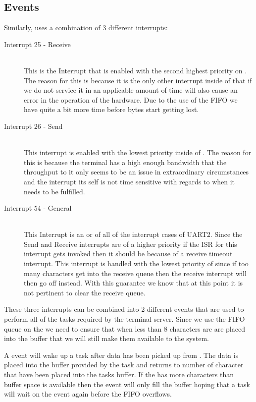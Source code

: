 \documentclass[pdftex,10pt,a4paper]{article}
\begin{document}
\subsection*{ Events}
Similarly,  uses a combination of 3 different interrupts:
\begin{description}
\item[Interrupt 25 -  Receive] \hfill \\
	This is the Interrupt that is enabled with the second highest priority
	on . The reason for this is because it is the only other
	interrupt inside of  that if we do not service it in an
	applicable amount of time will also cause an error in the operation of
	the hardware. Due to the use of the FIFO we have quite a bit more time
	before bytes start getting lost.
\item[Interrupt 26 -  Send] \hfill \\
	This interrupt is enabled with the lowest priority inside of
	. The reason for this is because the terminal has a high
	enough bandwidth that the throughput to it only seems to be an issue
	in extraordinary circumstances and the interrupt its self is not time
	sensitive with regards to when it needs to be fulfilled.
\item[Interrupt 54 -  General] \hfill \\
	This Interrupt is an or of all of the interrupt cases of UART2.
	Since the  Send and Receive interrupts are of a higher
	priority if the ISR for this interrupt gets invoked then it should
	be because of a receive timeout interrupt. This interrupt is handled
	with the lowest priority of  since if too many characters
	get into the receive queue then the  receive interrupt
	will then go off instead. With this guarantee we know that at this
	point it is not pertinent to clear the receive queue.
\end{description}

These three interrupts can be combined into 2 different events that are used to
perform all of the tasks required by the terminal server. Since we use the FIFO
queue on the  we need to ensure that when less than 8 characters are
are placed into the buffer that we will still make them available to the system.

A  event will wake up a task after data has been picked up
from . The data is placed into the buffer provided by the task and
returns to number of character that have been placed into the tasks buffer. If
the  has more characters than buffer space is available then the event
will only fill the buffer hoping that a task will wait on the event again
before the FIFO overflows.
\end{document}

